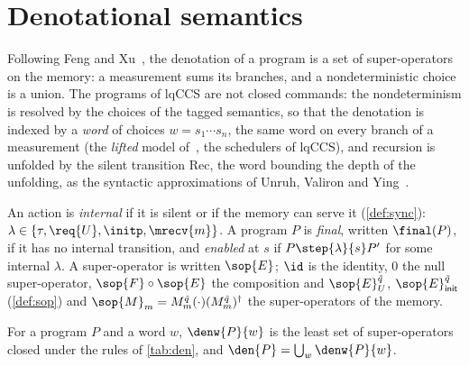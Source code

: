 \section{Denotational semantics}\label{sec:den}

Following Feng and Xu~\cite{FengXu23}, the denotation of a program is a set
of super-operators on the memory: a measurement sums its branches, and a
nondeterministic choice is a union. The programs of lqCCS are not closed
commands: the nondeterminism is resolved by the choices of the tagged
semantics, so that the denotation is indexed by a \emph{word} of choices
$w = s_1 \cdots s_n$, the same word on every branch of a measurement (the
\emph{lifted} model of~\cite{FengXu23}, the schedulers of lqCCS), and
recursion is unfolded by the silent transition Rec, the word bounding the
depth of the unfolding, as the syntactic approximations of Unruh, Valiron and
Ying~\cite[Lemma 3.3]{UVY26}.

An action is \emph{internal} if it is silent or if the memory can serve it
(\cref{def:sync}): $\lambda \in \{\tau, \req{U}, \initp, \mrecv{m}\}$. A program $P$ is
\emph{final}, written $\final(P)$, if it has no internal transition, and
\emph{enabled} at $s$ if $P \step{\lambda}{s} P'$ for some internal $\lambda$.
A super-operator is written $\sop{E}$; $\id$ is the identity, $0$ the null
super-operator, $\sop{F} \circ \sop{E}$ the composition and
$\sop{E}_U^{\tilde q}$, $\sop{E}_{\mathsf{init}}^{\tilde q}$
(\cref{def:sop}) and $\sop{M}_m = M_m^{\tilde q}(\cdot)(M_m^{\tilde q})^\dagger$
the super-operators of the memory.

\begin{definition}[Denotation]\label{def:den}
For a program $P$ and a word $w$, $\denw{P}{w}$ is the least set of
super-operators closed under the rules of \cref{tab:den}, and
$\den{P} = \bigcup_w \denw{P}{w}$.
\end{definition}

